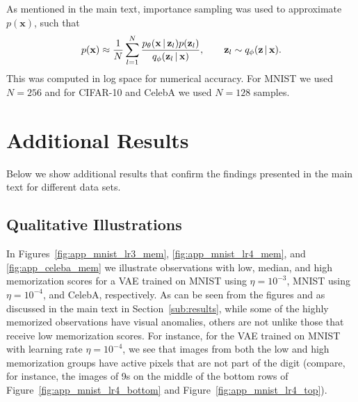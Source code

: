 \documentclass{article}
\newcommand{\bft}[1]{\mathbf{#1}}
\newcommand{\given}{\,|\,}
\begin{document}
%

As mentioned in the main text, importance sampling was used to approximate 
$p(\bft{x})$, such that
\begin{equation}
	p(\bft{x}) \approx \frac{1}{N} \sum_{l=1}^N \frac{%
		p_{\theta}(\bft{x} \given \bft{z}_l) p(\bft{z}_l)%
	}{%
		q_{\phi}(\bft{z}_l \given \bft{x})
	}, \qquad \bft{z}_l \sim q_{\phi}(\bft{z} \given \bft{x}).
\end{equation}
This was computed in log space for numerical accuracy. For MNIST we used $N = 
256$ and for CIFAR-10 and CelebA we used $N = 128$ samples.

\FloatBarrier
\section{Additional Results}%
\label{app:additional_results}

Below we show additional results that confirm the findings presented in the 
main text for different data sets.

\subsection{Qualitative Illustrations}%
\label{sub:qualitative_illustrations}

In Figures~\ref{fig:app_mnist_lr3_mem}, \ref{fig:app_mnist_lr4_mem}, and 
\ref{fig:app_celeba_mem} we illustrate observations with low, median, and high 
memorization scores for a VAE trained on MNIST using $\eta = 10^{-3}$, MNIST 
using $\eta = 10^{-4}$, and CelebA, respectively. As can be seen from the 
figures and as discussed in the main text in Section~\ref{sub:results}, while 
some of the highly memorized observations have visual anomalies, others are 
not unlike those that receive low memorization scores. For instance, for the 
VAE trained on MNIST with learning rate $\eta = 10^{-4}$, we see that images 
from both the low and high memorization groups have active pixels that are not 
part of the digit (compare, for instance, the images of 9s on the middle of 
the bottom rows of Figure~\ref{fig:app_mnist_lr4_bottom} and 
Figure~\ref{fig:app_mnist_lr4_top}).  
\end{document}
